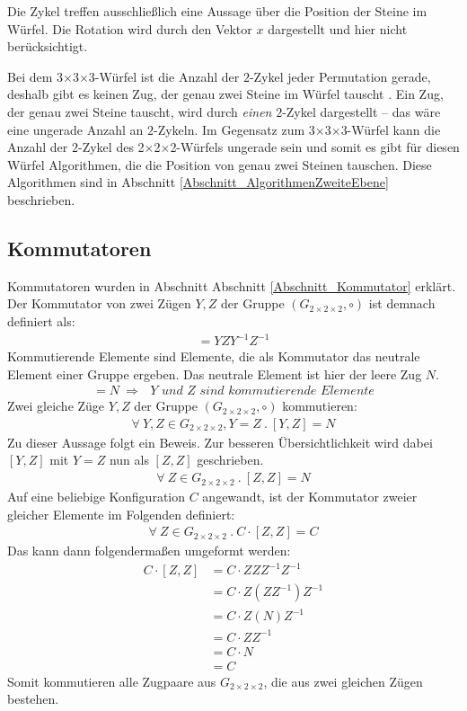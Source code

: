 \documentclass[12pt,a4paper, usenames, dvipsnames]{article}
\theoremstyle{mystyle}
\theoremstyle{definition}
\newcommand{\Gtwo}{\ensuremath{G_{2\times 2\times 2}}}
\newcommand{\Ttwo}{2$\times$2$\times$2-}
\newcommand{\Tthree}{3$\times$3$\times$3-}
\begin{document}
Die Zykel treffen ausschließlich eine Aussage über die Position der Steine im Würfel. Die Rotation wird durch den Vektor $x$ dargestellt und hier nicht berücksichtigt. 

Bei dem \Tthree Würfel ist die Anzahl der $2$-Zykel jeder Permutation gerade, deshalb gibt es keinen Zug, der genau zwei Steine im Würfel tauscht \cite{TD}. Ein Zug, der genau zwei Steine tauscht, wird durch \textit{einen} $2$-Zykel dargestellt -- das wäre eine ungerade Anzahl an $2$-Zykeln. Im Gegensatz zum \Tthree Würfel kann die Anzahl der $2$-Zykel des \Ttwo Würfels ungerade sein und somit es gibt für diesen Würfel Algorithmen, die die Position von genau zwei Steinen tauschen. Diese Algorithmen sind in Abschnitt \ref{Abschnitt_AlgorithmenZweiteEbene} beschrieben. 

%
%
%
%
%
%
%
%
%
%
%
%
%
%
%
%
%
%
%
%
\subsection{Kommutatoren}
\label{Abschnitt_Kommutatoren8}

Kommutatoren wurden in Abschnitt Abschnitt \ref{Abschnitt_Kommutator} erklärt. Der Kommutator von zwei Zügen $Y, Z$ der Gruppe $(\Gtwo, \circ)$ ist demnach definiert als:
\begin{align*}
[Y,Z]=YZY^{-1}Z^{-1}
\end{align*}
Kommutierende Elemente sind Elemente, die als Kommutator das neutrale Element einer Gruppe ergeben. Das neutrale Element ist hier der leere Zug $N$.
\begin{align*}
[Y,Z]= N\ \Rightarrow \textit{ $Y$ und $Z$ sind kommutierende Elemente}
\end{align*}
Zwei gleiche Züge $Y, Z$ der Gruppe $(\Gtwo, \circ)$ kommutieren:
\begin{align*}
\forall \ Y, Z \in \Gtwo, Y = Z \ . \ [Y, Z] = N
\end{align*}
Zu dieser Aussage folgt ein Beweis. Zur besseren Übersichtlichkeit wird dabei $[Y,Z]$ mit $Y=Z$ nun als $[Z,Z]$ geschrieben.
\begin{align*}
\forall \ Z \in \Gtwo\ . \ [Z, Z] = N
\end{align*}
Auf eine beliebige Konfiguration $C$ angewandt, ist der Kommutator zweier gleicher Elemente im Folgenden definiert:
\begin{align*}
\forall \ Z \in \Gtwo\ . \ C \cdot [Z, Z] = C
\end{align*}
Das kann dann folgendermaßen umgeformt werden:
\begin{align*}
C \cdot [Z, Z] & = C \cdot ZZZ^{-1}Z^{-1} \\
& = C \cdot Z(ZZ^{-1})Z^{-1} \\
& = C \cdot Z(N)Z^{-1} \\
& = C \cdot ZZ^{-1} \\
& = C \cdot N \\
& = C
\end{align*}
Somit kommutieren alle Zugpaare aus $\Gtwo$, die aus zwei gleichen Zügen bestehen.
\end{document}
